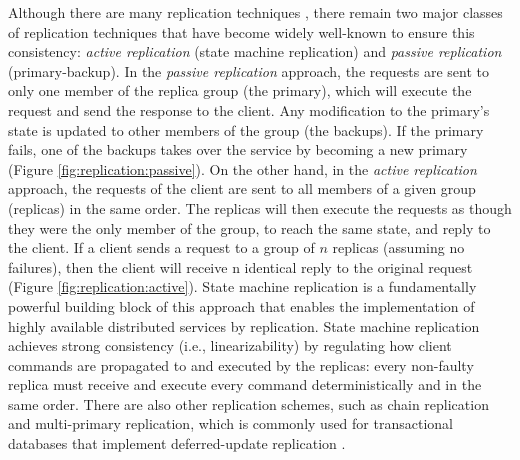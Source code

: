 Although there are many replication techniques \cite{Replication:book}, there
remain two major classes of replication techniques that have become widely
well-known to ensure this consistency: \emph{active replication} (state machine
replication) and \emph{passive replication} (primary-backup).
In the \emph{passive replication} approach, the requests are sent to only one
member of the replica group (the primary), which will execute the request and
send the response to the client. Any modification to the primary's state is
updated to other members of the group (the backups). If the primary fails, one
of the backups takes over the service by becoming a new primary (Figure
\ref{fig:replication:passive}). On the other hand, in the \emph{active
replication} approach, the requests of the client are sent to all members of a
given group (replicas) in the same order. The replicas will then execute the
requests as though they were the only member of the group, to reach the same
state, and reply to the client. If a client sends a request to a group of $n$
replicas (assuming no failures), then the client will receive n identical reply
to the original request (Figure \ref{fig:replication:active}). State machine
replication is a fundamentally powerful building block of this approach that
enables the implementation of highly available distributed services by
replication. State machine replication achieves strong consistency (i.e.,
linearizability) by regulating how client commands are propagated to and
executed by the replicas: every non-faulty replica must receive and execute
every command deterministically and in the same order. There are also other
replication schemes, such as chain replication \cite {chainreplication,
chainreplication:byzantine} and multi-primary replication, which is commonly
used for transactional databases that implement deferred-update replication
\cite{sciascia2012sdur, Replication:book, chundi96dur}.

